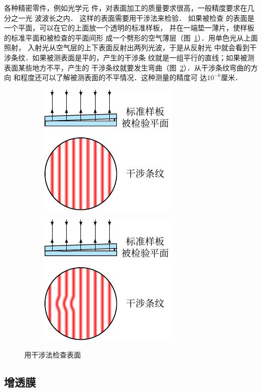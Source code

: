各种精密零件，例如光学元
件，对表面加工的质量要求很高，一般精度要求在几分之一光
波波长之内．
这样的表面需要用干涉法来检验．
如果被检查
的表面是一个平面，可以在它的上面放一个透明的标准样板，
并在一端垫一薄片，使样板的标准平面和被检查的平面间形
成一个劈形的空气薄层（图~\ref{fig_C_6-5a}）．用单色光从上面照射，
入射光从空气层的上下表面反射出两列光波，于是从反射光
中就会看到干涉条纹．如果被测表面是平的，产生的干涉条
纹就是一组平行的直线；如果被测表面某些地方不平，产生的
干涉条纹就要发生弯曲（图~\ref{fig_C_6-5b}）．从干涉条纹弯曲的方向
和程度还可以了解被测表面的不平情况．这种测量的精度可
达$10^{-6}$厘米．
\begin{figure}[htbp]
	\centering
	\begin{subfigure}{0.4\linewidth}
		\centering
		\includegraphics{fig/C/6-5a.pdf}
		\caption{}\label{fig_C_6-5a}
	\end{subfigure}
	\hfil
	\begin{subfigure}{0.4\linewidth}
		\centering
		\includegraphics{fig/C/6-5b.pdf}
		\caption{}\label{fig_C_6-5b}
	\end{subfigure}
	\caption{用干涉法检查表面}\label{fig_C_6-5}
\end{figure}


\subsection{增透膜}

